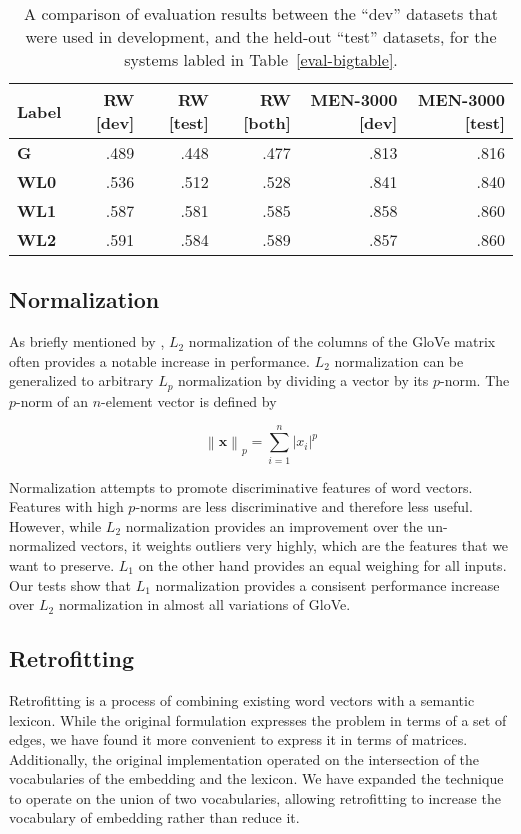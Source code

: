 \documentclass[letterpaper]{article}
\begin{document}
\begin{table*}[t]
\centering
\begin{tabular}{lrrrrr}
\toprule
Label   & RW [dev] & RW [test] & RW [both] & MEN-3000 [dev] & MEN-3000 [test] \\
\midrule
\bf G   & .489  & .448  & .477  & .813  & .816 \\
\bf WL0 & .536  & .512  & .528  & .841  & .840 \\
\bf WL1 & .587  & .581  & .585  & .858  & .860 \\
\bf WL2 & .591  & .584  & .589  & .857  & .860 \\
\bottomrule
\end{tabular}

\caption{
    A comparison of evaluation results between the ``dev'' datasets that were
    used in development, and the held-out ``test'' datasets, for the systems
    labled in Table~\ref{eval-bigtable}.
}
\label{eval-dev-test}
\end{table*}


\subsection{Normalization}

As briefly mentioned by , $L_2$ normalization of
the columns of the GloVe matrix often provides a notable increase in
performance. $L_2$ normalization can be generalized to arbitrary
$L_p$ normalization by dividing a vector by its $p$-norm. The $p$-norm of an
$n$-element vector is defined by

$$ \left\|\mathbf{x}\right\|_p
  = \sum_{i=1}^n \left|x_i\right|^p$$

Normalization attempts to promote discriminative features of word vectors.
Features with high $p$-norms are less discriminative and therefore less useful.
However, while $L_2$ normalization provides an improvement over the un-normalized
vectors, it weights outliers very highly, which are the features that we want to
preserve. $L_1$ on the other hand provides an equal weighing for all inputs.
Our tests show that $L_1$ normalization provides a consisent performance
increase over $L_2$ normalization in almost all variations of GloVe.

\subsection{Retrofitting}

Retrofitting \cite{faruqui2014retrofitting} is a process of combining existing
word vectors with a semantic lexicon. While the original formulation expresses
the problem in terms of a set of edges, we have found it more convenient to
express it in terms of matrices. Additionally, the original implementation
operated on the intersection of the vocabularies of the embedding and the
lexicon. We have expanded the technique to operate on the union of two
vocabularies, allowing retrofitting to increase the vocabulary of embedding
rather than reduce it.
\end{document}

